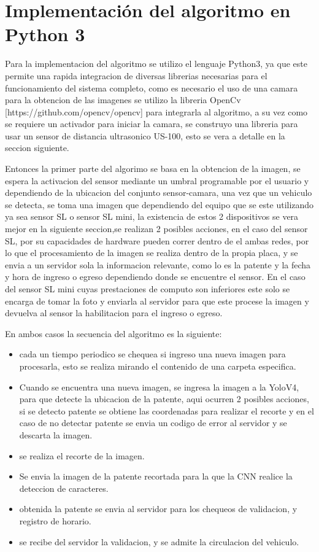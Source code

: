 \section{Implementación del algoritmo en Python 3}

Para la implementacion del algoritmo se utilizo el lenguaje Python3, ya que este permite una rapida integracion de diversas librerias necesarias
para el funcionamiento del sistema completo, como es necesario el uso de una camara para la obtencion de las imagenes se utilizo la libreria
OpenCv [https://github.com/opencv/opencv] para integrarla al algoritmo, a su vez como se requiere un activador para iniciar la camara,
se construyo una libreria para usar un sensor de distancia ultrasonico US-100, esto se vera a detalle en la seccion siguiente.

Entonces la primer parte del algorimo se basa en la obtencion de la imagen, se espera la activacion del sensor mediante un umbral programable
por el usuario y dependiendo de la ubicacion del conjunto sensor-camara, una vez que un vehiculo se detecta, se toma una imagen que dependiendo
del equipo que se este utilizando ya sea sensor SL o sensor SL mini, la existencia de estos 2 dispositivos se vera mejor en la siguiente
seccion,se realizan 2 posibles acciones, en el caso del sensor SL, por su capacidades de hardware pueden correr dentro de el ambas redes, por lo
que el procesamiento de la imagen se realiza dentro de la propia placa, y se envia a un servidor sola la informacion relevante, como lo es la patente y
la fecha y hora de ingreso o egreso dependiendo donde se encuentre el sensor. En el caso del sensor SL mini cuyas prestaciones de computo son
inferiores este solo se encarga de tomar la foto y enviarla al servidor para que este procese la imagen y devuelva al sensor la habilitacion para el
ingreso o egreso.

En ambos casos la secuencia del algoritmo es la siguiente:
\begin{itemize}
    \item cada un tiempo periodico se chequea si ingreso una nueva imagen para procesarla, esto se realiza mirando el contenido de una carpeta especifica.
    \item Cuando se encuentra una nueva imagen, se ingresa la imagen a la YoloV4, para que detecte la ubicacion de la patente, aqui ocurren 2 posibles acciones, si
          se detecto patente se obtiene las coordenadas para realizar el recorte y en el caso de no detectar patente se envia un codigo de error al servidor y se descarta la imagen.
    \item se realiza el recorte de la imagen.
    \item Se envia la imagen de la patente recortada para la que la CNN realice la deteccion de caracteres.
    \item obtenida la patente se envia al servidor para los chequeos de validacion, y registro de horario.
    \item se recibe del servidor la validacion, y se admite la circulacion del vehiculo.
\end{itemize}




